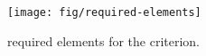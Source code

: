 \begin{figure}[!ht]
\begin{center}
\texttt{[image: fig/required-elements]}
\caption{\label{fig:requirements} 
required elements for the  criterion.}
\end{center}
\end{figure}
